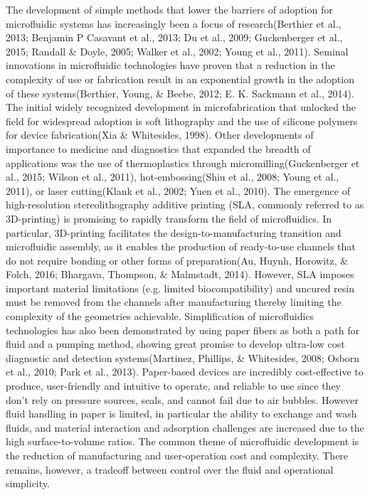 The development of simple methods that lower the barriers of adoption for microfluidic systems has increasingly been a focus of research(Berthier et al., 2013; Benjamin P Casavant et al., 2013; Du et al., 2009; Guckenberger et al., 2015; Randall \& Doyle, 2005; Walker et al., 2002; Young et al., 2011). Seminal innovations in microfluidic technologies have proven that a reduction in the complexity of use or fabrication result in an exponential growth in the adoption of these systems(Berthier, Young, \& Beebe, 2012; E. K. Sackmann et al., 2014). The initial widely recognized development in microfabrication that unlocked the field for widespread adoption is soft lithography and the use of silicone polymers for device fabrication(Xia \& Whitesides, 1998). Other developments of importance to medicine and diagnostics that expanded the breadth of applications was the use of thermoplastics through micromilling(Guckenberger et al., 2015; Wilson et al., 2011), hot-embossing(Shiu et al., 2008; Young et al., 2011), or laser cutting(Klank et al., 2002; Yuen et al., 2010). The emergence of high-resolution stereolithography additive printing (SLA, commonly referred to as 3D-printing) is promising to rapidly transform the field of microfluidics. In particular, 3D-printing facilitates the design-to-manufacturing transition and microfluidic assembly, as it enables the production of ready-to-use channels that do not require bonding or other forms of preparation(Au, Huynh, Horowitz, \& Folch, 2016; Bhargava, Thompson, \& Malmstadt, 2014). However, SLA imposes important material limitations (e.g. limited biocompatibility) and uncured resin must be removed from the channels after manufacturing thereby limiting the complexity of the geometries achievable. Simplification of microfluidics technologies has also been demonstrated by using paper fibers as both a path for fluid and a pumping method, showing great promise to develop ultra-low cost diagnostic and detection systems(Martinez, Phillips, \& Whitesides, 2008; Osborn et al., 2010; Park et al., 2013). Paper-based devices are incredibly cost-effective to produce, user-friendly and intuitive to operate, and reliable to use since they don’t rely on pressure sources, seals, and cannot fail due to air bubbles. However fluid handling in paper is limited, in particular the ability to exchange and wash fluids, and material interaction and adsorption challenges are increased due to the high surface-to-volume ratios. The common theme of microfluidic development is the reduction of manufacturing and user-operation cost and complexity. There remains, however, a tradeoff between control over the fluid and operational simplicity.
